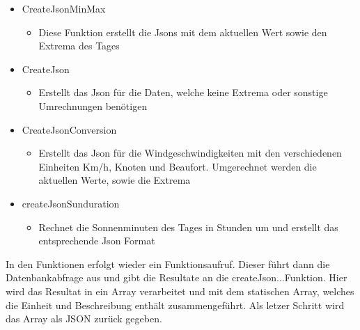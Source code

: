 \begin{itemize}
\item CreateJsonMinMax
\begin{itemize}
\item Diese Funktion erstellt die Jsons mit dem aktuellen Wert sowie den Extrema des Tages
\end{itemize}
\item CreateJson
\begin{itemize}
\item Erstellt das Json für die Daten, welche keine Extrema oder sonstige Umrechnungen benötigen
\end{itemize}
\item CreateJsonConversion
\begin{itemize}
\item Erstellt das Json für die Windgeschwindigkeiten mit den verschiedenen Einheiten Km/h, Knoten und Beaufort. Umgerechnet werden die aktuellen Werte, sowie die Extrema
\end{itemize}
\item createJsonSunduration
\begin{itemize}
\item Rechnet die Sonnenminuten des Tages in Stunden um und erstellt das entsprechende Json Format
\end{itemize}
\end{itemize}

In den Funktionen erfolgt wieder ein Funktionsaufruf. Dieser führt dann die Datenbankabfrage aus und gibt die Resultate an die createJson...Funktion. Hier wird das Resultat in ein Array verarbeitet und mit dem statischen Array, welches die Einheit und Beschreibung enthält zusammengeführt. Als letzer Schritt wird das Array als JSON zurück gegeben. 


